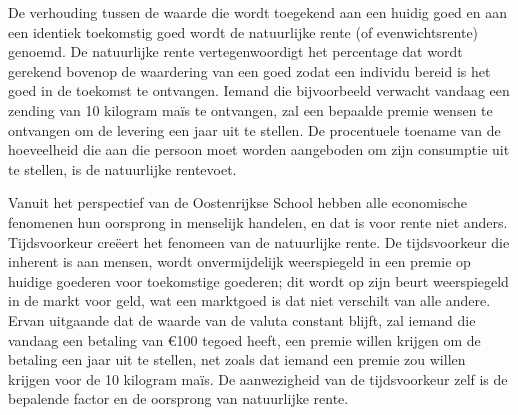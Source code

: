 De verhouding tussen de waarde die wordt toegekend aan een huidig goed en aan een identiek toekomstig goed wordt de natuurlijke rente (of evenwichtsrente) genoemd. De natuurlijke rente vertegenwoordigt het percentage dat wordt gerekend bovenop de waardering van een goed zodat een individu bereid is het goed in de toekomst te ontvangen. Iemand die bijvoorbeeld verwacht vandaag een zending van 10 kilogram maïs te ontvangen, zal een bepaalde premie wensen te ontvangen om de levering een jaar uit te stellen. De procentuele toename van de hoeveelheid die aan die persoon moet worden aangeboden om zijn consumptie uit te stellen, is de natuurlijke rentevoet.

Vanuit het perspectief van de Oostenrijkse School hebben alle economische fenomenen hun oorsprong in menselijk handelen, en dat is voor rente niet anders. Tijdsvoorkeur creëert het fenomeen van de natuurlijke rente. De tijdsvoorkeur die inherent is aan mensen, wordt onvermijdelijk weerspiegeld in een premie op huidige goederen voor toekomstige goederen; dit wordt op zijn beurt weerspiegeld in de markt voor geld, wat een marktgoed is dat niet verschilt van alle andere. Ervan uitgaande dat de waarde van de valuta constant blijft, zal iemand die vandaag een betaling van €100 tegoed heeft, een premie willen krijgen om de betaling een jaar uit te stellen, net zoals dat iemand een premie zou willen krijgen voor de 10 kilogram maïs. De aanwezigheid van de tijdsvoorkeur zelf is de bepalende factor en de oorsprong van natuurlijke rente.

